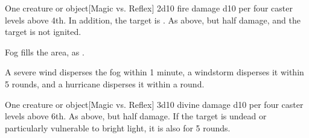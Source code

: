 \begin{spellheader}
    \spellrng{\rngclose}
    \spelldur{\durshort}
\end{spellheader}
\begin{spelleffects}
    \begin{spelltarget}{One creature or object}[Magic vs. Reflex]
        \spellsuccess 2d10 fire damage \add d10 per four caster levels above 4th. In addition, the target is \ignited.
        \spellfailure As above, but half damage, and the target is not ignited.
    \end{spelltarget}
\end{spelleffects}
\begin{spellfooter}
    
\end{spellfooter}

\begin{spellheader}
\end{spellheader}
\begin{spelleffects}
    \spelleffect Fog fills the area, as .
\end{spelleffects}
\begin{spellfooter}
    \spellnotes \fogspellnotes A severe wind disperses the fog within 1 minute, a windstorm disperses it within 5 rounds, and a hurricane disperses it within a round.
\end{spellfooter}

\begin{spellheader}
    \spellrng{\rngclose}
\end{spellheader}
\begin{spelleffects}
    \begin{spelltarget}{One creature or object}[Magic vs. Reflex]
        \spellsuccess 3d10 divine damage \add d10 per four caster levels above 6th.
        \spellfailure As above, but half damage.
        \spelleffect If the target is undead or particularly vulnerable to bright light, it is also \dazzled for 5 rounds.
    \end{spelltarget}
\end{spelleffects}
\begin{spellfooter}
    
\end{spellfooter}

